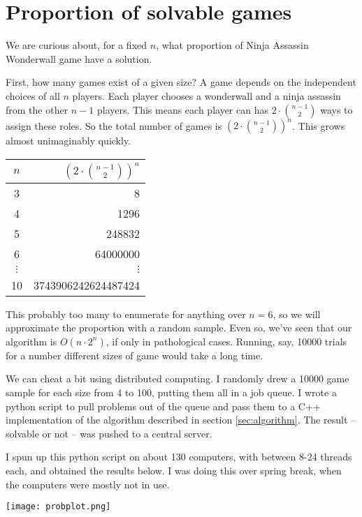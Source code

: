 \documentclass[12pt,x11names, rgb]{article}
\begin{document}
\section{Proportion of solvable games}
    \label{sec:prob}
    We are curious about, for a fixed $n$, what proportion of Ninja Assassin Wonderwall game have a solution. 

    First, how many games exist of a given size? A game depends on the independent choices of all $n$ players. Each player chooses a wonderwall and a ninja assassin from the other $n-1$ players. This means each player can has $2\cdot \binom{n-1}{2}$ ways to assign these roles. So the total number of games is $\displaystyle \left(2 \cdot \binom{n-1}{2}\right)^n$. This grows almost unimaginably quickly. 
    \begin{center}
        \begin{tabular}{c | r}
        $n$ & $\displaystyle \left(2 \cdot \binom{n-1}{2}\right)^n$\\
        \hline
        3 & 8\\
        4 & 1296 \\
        5 & 248832 \\
        6 & 64000000\\
        $\vdots$ & $\vdots$ \\
        10 & 3743906242624487424
        \end{tabular}
    \end{center}
    This probably too many to enumerate for anything over $n=6$, so we will approximate the proportion with a random sample. Even so, we've seen that our algorithm is $O(n\cdot 2^n)$, if only in pathological cases. Running, say, 10000 trials for a number different sizes of game would take a long time.

    We can cheat a bit using distributed computing. I randomly drew a 10000 game sample for each size from 4 to 100, putting them all in a job queue. I wrote a python script to pull problems out of the queue and pass them to a C++ implementation of the algorithm described in section \ref{sec:algorithm}. The result -- solvable or not -- was pushed to a central server. 

    I spun up this python script on about 130 computers, with between 8-24 threads each, and obtained the results below. I was doing this over spring break, when the computers were mostly not in use.

    \begin{center}
    \texttt{[image: probplot.png]}
    \end{center}
\end{document}
